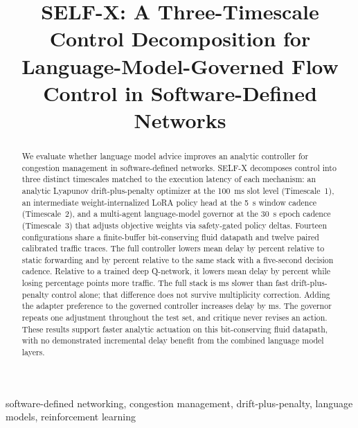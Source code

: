 \documentclass[conference]{IEEEtran}
\begin{document}
\title{SELF-X: A Three-Timescale Control Decomposition for Language-Model-Governed Flow Control in Software-Defined Networks}
\author{%
}
\maketitle

\begin{abstract}
We evaluate whether language model advice improves an analytic controller for congestion management in software-defined networks. SELF-X decomposes control into three distinct timescales matched to the execution latency of each mechanism: an analytic Lyapunov drift-plus-penalty optimizer at the 100~ms slot level (Timescale~1), an intermediate weight-internalized LoRA policy head at the 5~s window cadence (Timescale~2), and a multi-agent language-model governor at the 30~s epoch cadence (Timescale~3) that adjusts objective weights via safety-gated policy deltas. Fourteen configurations share a finite-buffer bit-conserving fluid datapath and twelve paired calibrated traffic traces. The full controller lowers mean delay by \AuditStaticReduction{} percent relative to static forwarding and by \AuditCadenceReduction{} percent relative to the same stack with a five-second decision cadence. Relative to a trained deep Q-network, it lowers mean delay by \AuditNeuralReduction{} percent while losing \AuditNeuralLossDelta{} percentage points more traffic. The full stack is \AuditDPPDelta{} ms slower than fast drift-plus-penalty control alone; that difference does not survive multiplicity correction. Adding the adapter preference to the governed controller increases delay by \AuditNoLoRADelta{} ms. The governor repeats one adjustment throughout the test set, and critique never revises an action. These results support faster analytic actuation on this bit-conserving fluid datapath, with no demonstrated incremental delay benefit from the combined language model layers.
\end{abstract}
\begin{IEEEkeywords}
software-defined networking, congestion management, drift-plus-penalty, language models, reinforcement learning
\end{IEEEkeywords}
\end{document}
